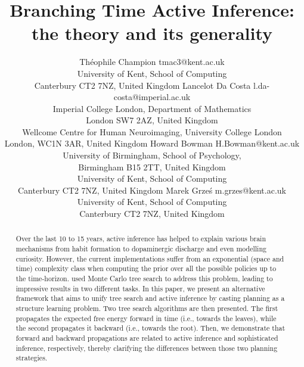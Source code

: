 \documentclass[twoside,11pt]{article}
\begin{document}
\title{Branching Time Active Inference:\\
{\small the theory and its generality}}

\author{\name Théophile Champion \email tmac3@kent.ac.uk \\
       \addr University of Kent, School of Computing\\
       Canterbury CT2 7NZ, United Kingdom
       \AND
       \name Lancelot Da Costa \email l.da-costa@imperial.ac.uk \\
       \addr Imperial College London, Department of Mathematics\\
       London SW7 2AZ, United Kingdom\\
       Wellcome Centre for Human Neuroimaging, University College London\\
       London, WC1N 3AR, United Kingdom
       \AND
       \name Howard Bowman \email H.Bowman@kent.ac.uk \\
       \addr University of Birmingham, School of Psychology,\\
       Birmingham B15 2TT, United Kingdom\\
       University of Kent, School of Computing\\
       Canterbury CT2 7NZ, United Kingdom
       \AND
       \name Marek Grze\'s \email m.grzes@kent.ac.uk \\
       \addr University of Kent, School of Computing\\
       Canterbury CT2 7NZ, United Kingdom
       }
       

\maketitle

\begin{abstract}%
Over the last 10 to 15 years, active inference has helped to explain various brain mechanisms from habit formation to dopaminergic discharge and even modelling curiosity. However, the current implementations suffer from an exponential (space and time) complexity class when computing the prior over all the possible policies up to the time-horizon. \citet{DeepAIwithMCMC} used Monte Carlo tree search to address this problem, leading to impressive results in two different tasks. In this paper, we present an alternative framework that aims to unify tree search and active inference by casting planning as a structure learning problem. Two tree search algorithms are then presented. The first propagates the expected free energy forward in time (i.e., towards the leaves), while the second propagates it backward (i.e., towards the root). Then, we demonstrate that forward and backward propagations are related to active inference and sophisticated inference, respectively, thereby clarifying the differences between those two planning strategies.
\end{abstract}
\end{document}
